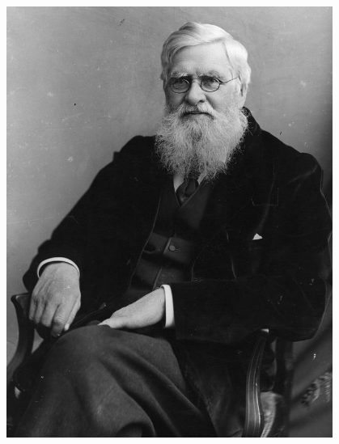 \documentclass[10pt]{beamer}
\begin{document}
\begin{frame}
\begin{columns}
		\begin{column}{0.5\textwidth}
			\begin{center}
				\includegraphics[width=0.8\textwidth]{figures/wallace2.jpg}
			\end{center}
		\end{column}
	\end{columns}
\end{frame}  
\end{document}
